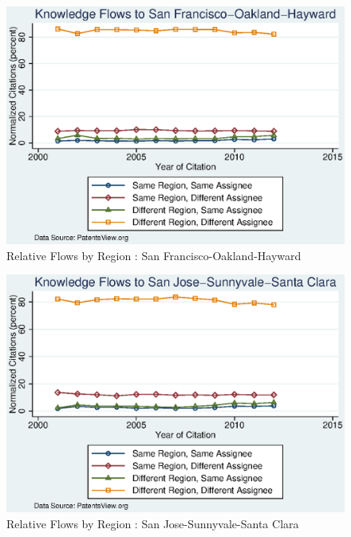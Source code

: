 \documentclass[12pt]{article}
\begin{document}
\begin{figure}[h]
\begin{centering}
  \includegraphics[width=\textwidth]{SanFrancisco-Oakland-HaywardNormalized}
  \caption{Relative Flows by Region : San Francisco-Oakland-Hayward}
  \label{fig:SanFrancisco-Oakland-HaywardNormalized}
\end{centering}
\end{figure}

\begin{figure}[h]
\begin{centering}
  \includegraphics[width=\textwidth]{SanJose-Sunnyvale-SantaClaraNormalized}
  \caption{Relative Flows by Region : San Jose-Sunnyvale-Santa Clara}
  \label{fig:SanJose-Sunnyvale-SantaClaraNormalized}
\end{centering}
\end{figure}
\end{document}
